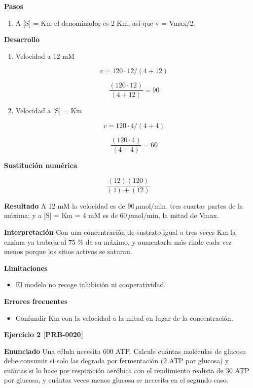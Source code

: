 \documentclass{book}
\begin{document}
\noindent\textbf{Pasos}
\begin{enumerate}
\item
A [S] = Km el denominador es 2 Km, así que v = Vmax/2.

\end{enumerate}

\noindent\textbf{Desarrollo}
\begin{enumerate}
\item
Velocidad a 12 mM


\[
v = 120 \cdot 12/(4+12)
\]

\[
\frac{\left(120\cdot 12\right)}{\left(4+12\right)} = 90
\]
\item
Velocidad a [S] = Km


\[
v = 120 \cdot 4/(4+4)
\]

\[
\frac{\left(120\cdot 4\right)}{\left(4+4\right)} = 60
\]
\end{enumerate}

\noindent\textbf{Sustitución numérica}

\[
\frac{\left(12\right) \left(120\right)}{\left(4\right) + \left(12\right)}
\]

\noindent\textbf{Resultado}
A 12 mM la velocidad es de \(90\,\mu\mathrm{mol/min}\), tres cuartas partes de la máxima; y a [S] = Km = 4 mM es de \(60\,\mu\mathrm{mol/min}\), la mitad de Vmax.


\noindent\textbf{Interpretación}
Con una concentración de sustrato igual a tres veces Km la enzima ya trabaja al 75 \% de su máximo, y aumentarla más rinde cada vez menos porque los sitios activos se saturan.


\noindent\textbf{Limitaciones}
\begin{itemize}
\item El modelo no recoge inhibición ni cooperatividad.
\end{itemize}

\noindent\textbf{Errores frecuentes}
\begin{itemize}
\item Confundir Km con la velocidad a la mitad en lugar de la concentración.
\end{itemize}

\noindent\textbf{Ejercicio 2 [PRB-0020]}

\noindent\textbf{Enunciado}
Una célula necesita 600 ATP. Calcule cuántas moléculas de glucosa debe consumir si solo las degrada por fermentación (2 ATP por glucosa) y cuántas si lo hace por respiración aeróbica con el rendimiento realista de 30 ATP por glucosa, y cuántas veces menos glucosa se necesita en el segundo caso.
\end{document}
